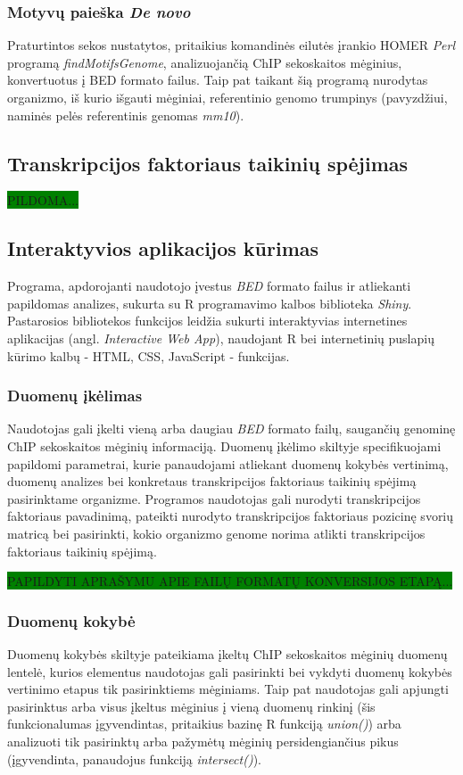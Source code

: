 \documentclass[12pt]{article}
\begin{document}
\subsubsection*{Motyvų paieška \emph{De novo}}
Praturtintos sekos nustatytos, pritaikius komandinės eilutės įrankio
HOMER\cite{HOMER} \emph{Perl} programą \emph{findMotifsGenome}, analizuojančią
ChIP sekoskaitos mėginius, konvertuotus į BED formato failus. Taip pat taikant
šią programą nurodytas organizmo, iš kurio išgauti mėginiai, referentinio genomo
trumpinys (pavyzdžiui, naminės pelės referentinis genomas \emph{mm10}).

\newpage

\subsection{Transkripcijos faktoriaus taikinių spėjimas}
\colorbox{green}{PILDOMA...}

\newpage

\subsection{Interaktyvios aplikacijos kūrimas}
Programa, apdorojanti naudotojo įvestus \emph{BED} formato failus ir atliekanti
papildomas analizes, sukurta su R programavimo kalbos biblioteka
\emph{Shiny}\cite{SHINY}. Pastarosios bibliotekos funkcijos leidžia sukurti
interaktyvias internetines aplikacijas (angl. \emph{Interactive Web App}),
naudojant R bei internetinių puslapių kūrimo kalbų - HTML, CSS, JavaScript -
funkcijas.

\subsubsection*{Duomenų įkėlimas}
Naudotojas gali įkelti vieną arba daugiau \emph{BED} formato failų, saugančių
genominę ChIP sekoskaitos mėginių informaciją. Duomenų įkėlimo skiltyje
specifikuojami papildomi parametrai, kurie panaudojami atliekant duomenų kokybės
vertinimą, duomenų analizes bei konkretaus transkripcijos faktoriaus taikinių
spėjimą pasirinktame organizme. Programos naudotojas gali nurodyti
transkripcijos faktoriaus pavadinimą, pateikti nurodyto transkripcijos
faktoriaus pozicinę svorių matricą bei pasirinkti, kokio organizmo genome
norima atlikti transkripcijos faktoriaus taikinių spėjimą.

\colorbox{green}{PAPILDYTI APRAŠYMU APIE FAILŲ FORMATŲ KONVERSIJOS ETAPĄ...}

\subsubsection*{Duomenų kokybė}
Duomenų kokybės skiltyje pateikiama įkeltų ChIP sekoskaitos mėginių duomenų
lentelė, kurios elementus naudotojas gali pasirinkti bei vykdyti duomenų
kokybės vertinimo etapus tik pasirinktiems mėginiams. Taip pat naudotojas
gali apjungti pasirinktus arba visus įkeltus mėginius į vieną duomenų rinkinį
(šis funkcionalumas įgyvendintas, pritaikius bazinę R funkciją \emph{union()})
arba analizuoti tik pasirinktų arba pažymėtų mėginių persidengiančius pikus
(įgyvendinta, panaudojus funkciją \emph{intersect()}).
\end{document}
